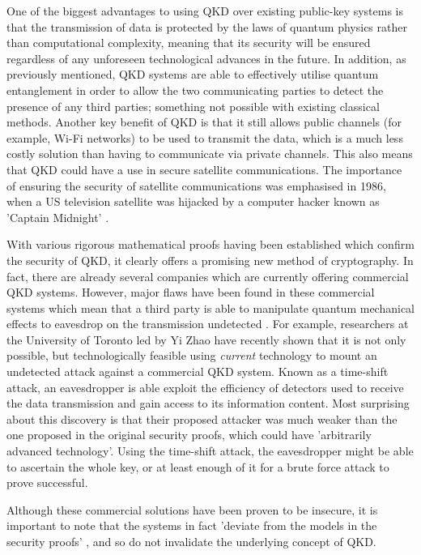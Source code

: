 \documentclass[runningheads,a4paper]{llncs}
\begin{document}
One of the biggest advantages to using QKD over existing public-key systems is that the transmission of data is protected by the laws of quantum physics rather than computational complexity, meaning that its security will be ensured regardless of any unforeseen technological advances in the future. In addition, as previously mentioned, QKD systems are able to effectively utilise quantum entanglement in order to allow the two communicating parties to detect the presence of any third parties; something not possible with existing classical methods. Another key benefit of QKD is that it still allows public channels (for example, Wi-Fi networks) to be used to transmit the data, which is a much less costly solution than having to communicate via private channels. This also means that QKD could have a use in secure satellite communications. The importance of ensuring the security of satellite communications was emphasised in 1986, when a US television satellite was hijacked by a computer hacker known as 'Captain Midnight' \cite{Hughes:2000uq}.

With various rigorous mathematical proofs having been established which confirm the security of QKD\cite{Deutsch:1996fk,Shor:2000uq}, it clearly offers a promising new method of cryptography. In fact, there are already several companies which are currently offering commercial QKD systems. However, major flaws have been found in these commercial systems which mean that a third party is able to manipulate quantum mechanical effects to eavesdrop on the transmission undetected \cite{Wiechers:2011fk,Zhao:2008fk}. For example, researchers at the University of Toronto led by Yi Zhao have recently shown that it is not only possible, but technologically feasible using \emph{current} technology to mount an undetected attack against a commercial QKD system. Known as a time-shift attack, an eavesdropper is able exploit the efficiency of detectors used to receive the data transmission and gain access to its information content. Most surprising about this discovery is that their proposed attacker was much weaker than the one proposed in the original security proofs, which could have 'arbitrarily advanced technology'. Using the time-shift attack, the eavesdropper might be able to ascertain the whole key, or at least enough of it for a brute force attack to prove successful. 

Although these commercial solutions have been proven to be insecure, it is important to note that the systems in fact 'deviate from the models in the security proofs' \cite{Lydersen:2010qy}, and so do not invalidate the underlying concept of QKD. 
\end{document}
